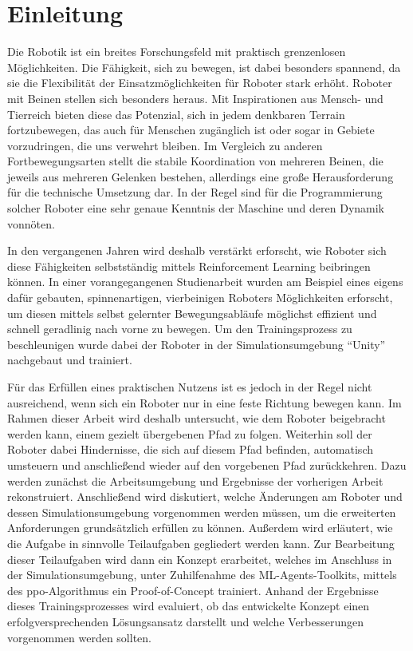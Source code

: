 \chapter{Einleitung}
\label{sec:einleitung}
Die Robotik ist ein breites Forschungsfeld mit praktisch grenzenlosen Möglichkeiten.
Die Fähigkeit, sich zu bewegen, ist dabei besonders spannend, da sie die Flexibilität der Einsatzmöglichkeiten für Roboter stark erhöht.
Roboter mit Beinen stellen sich besonders heraus.
Mit Inspirationen aus Mensch- und Tierreich bieten diese das Potenzial, sich in jedem denkbaren Terrain fortzubewegen, das auch für Menschen zugänglich ist oder sogar in Gebiete vorzudringen, die uns verwehrt bleiben.
Im Vergleich zu anderen Fortbewegungsarten stellt die stabile Koordination von mehreren Beinen, die jeweils aus mehreren Gelenken bestehen, allerdings eine große Herausforderung für die technische Umsetzung dar.
In der Regel sind für die Programmierung solcher Roboter eine sehr genaue Kenntnis der Maschine und deren Dynamik vonnöten.

In den vergangenen Jahren wird deshalb verstärkt erforscht, wie Roboter sich diese Fähigkeiten selbstständig mittels Reinforcement Learning beibringen können.
In einer vorangegangenen Studienarbeit wurden am Beispiel eines eigens dafür gebauten, spinnenartigen, vierbeinigen Roboters Möglichkeiten erforscht, um diesen mittels selbst gelernter Bewegungsabläufe möglichst effizient und schnell geradlinig nach vorne zu bewegen.
Um den Trainingsprozess zu beschleunigen wurde dabei der Roboter in der Simulationsumgebung \enquote{Unity} nachgebaut und trainiert.

Für das Erfüllen eines praktischen Nutzens ist es jedoch in der Regel nicht ausreichend, wenn sich ein Roboter nur in eine feste Richtung bewegen kann.
Im Rahmen dieser Arbeit wird deshalb untersucht, wie dem Roboter beigebracht werden kann, einem gezielt übergebenen Pfad zu folgen.
Weiterhin soll der Roboter dabei Hindernisse, die sich auf diesem Pfad befinden, automatisch umsteuern und anschließend wieder auf den vorgebenen Pfad zurückkehren. %
Dazu werden zunächst die Arbeitsumgebung und Ergebnisse der vorherigen Arbeit rekonstruiert.
Anschließend wird diskutiert, welche Änderungen am Roboter und dessen Simulationsumgebung vorgenommen werden müssen, um die erweiterten Anforderungen grundsätzlich erfüllen zu können.
Außerdem wird erläutert, wie die Aufgabe in sinnvolle Teilaufgaben gegliedert werden kann.
Zur Bearbeitung dieser Teilaufgaben wird dann ein Konzept erarbeitet, welches im Anschluss in der Simulationsumgebung, unter Zuhilfenahme des ML-Agents-Toolkits, mittels des \acl{ppo}-Algorithmus ein Proof-of-Concept trainiert.
Anhand der Ergebnisse dieses Trainingsprozesses wird evaluiert, ob das entwickelte Konzept einen erfolgversprechenden Lösungsansatz darstellt und welche Verbesserungen vorgenommen werden sollten.

